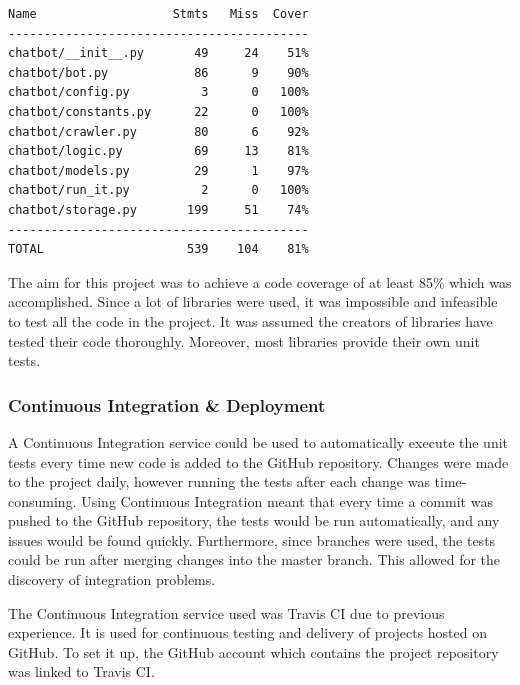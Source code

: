 \documentclass[12pt,a4paper]{article}
\newcommand{\captionstyle}[1] {
    \small{#1}
}
\begin{document}
\begin{lstlisting}[caption={\captionstyle{A code coverage report produced with pytest-cov.}}, label={lst:codecov},numbers=none]
Name                   Stmts   Miss  Cover
------------------------------------------
chatbot/__init__.py       49     24    51%
chatbot/bot.py            86      9    90%
chatbot/config.py          3      0   100%
chatbot/constants.py      22      0   100%
chatbot/crawler.py        80      6    92%
chatbot/logic.py          69     13    81%
chatbot/models.py         29      1    97%
chatbot/run_it.py          2      0   100%
chatbot/storage.py       199     51    74%
------------------------------------------
TOTAL                    539    104    81%    
\end{lstlisting}

The aim for this project was to achieve a code coverage of at least 85\% which was accomplished. Since a lot of libraries were used, it was impossible and infeasible to test all the code in the project. It was assumed the creators of libraries have tested their code thoroughly. Moreover, most libraries provide their own unit tests.

\subsubsection{Continuous Integration \& Deployment}
A Continuous Integration service could be used to automatically execute the unit tests every time new code is added to the GitHub repository. Changes were made to the project daily, however running the tests after each change was time-consuming. Using Continuous Integration meant that every time a commit was pushed to the GitHub repository, the tests would be run automatically, and any issues would be found quickly. Furthermore, since branches were used, the tests could be run after merging changes into the master branch. This allowed for the discovery of integration problems.

The Continuous Integration service used was Travis CI due to previous experience. It is used for continuous testing and delivery of projects hosted on GitHub. To set it up, the GitHub account which contains the project repository was linked to Travis CI. 
\end{document}

